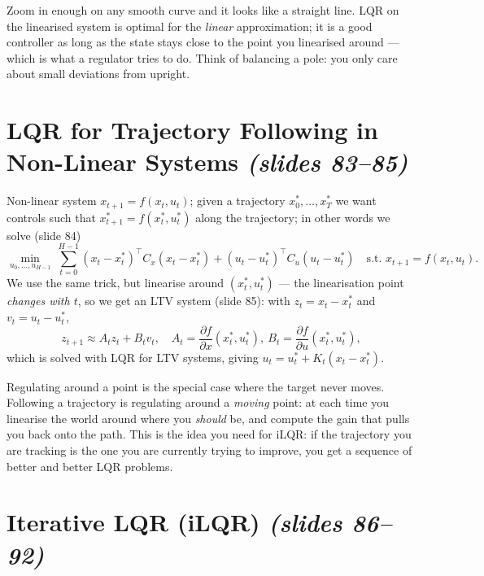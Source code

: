 \documentclass[11pt,a4paper]{article}
\newcommand{\slides}[1]{\emph{(slides #1)}}
\theoremstyle{plain}
\theoremstyle{definition}
\theoremstyle{remark}
\begin{document}
\begin{intuition}
Zoom in enough on any smooth curve and it looks like a straight line. LQR on the linearised system is optimal for the \emph{linear} approximation; it is a good controller as long as the state stays close to the point you linearised around --- which is what a regulator tries to do. Think of balancing a pole: you only care about small deviations from upright.
\end{intuition}

\section{LQR for Trajectory Following in Non-Linear Systems \slides{83--85}}

Non-linear system $x_{t+1}=f(x_t,u_t)$; given a trajectory $x^*_0,\dots,x^*_T$ we want controls such that $x^*_{t+1}=f(x^*_t,u^*_t)$ along the trajectory; in other words we solve (slide 84)
\[
\min_{u_0,\dots,u_{H-1}}\ \sum_{t=0}^{H-1}(x_t-x_t^*)^\top C_x(x_t-x^*_t)+(u_t-u^*_t)^\top C_u(u_t-u^*_t)\quad\text{s.t. } x_{t+1}=f(x_t,u_t).
\]
We use the same trick, but linearise around $(x^*_t,u^*_t)$ --- the linearisation point \emph{changes with $t$}, so we get an LTV system (slide 85): with $z_t=x_t-x^*_t$ and $v_t=u_t-u^*_t$,
\[
z_{t+1}\approx A_tz_t+B_tv_t,\quad A_t=\frac{\partial f}{\partial x}(x^*_t,u^*_t),\ B_t=\frac{\partial f}{\partial u}(x^*_t,u^*_t),
\]
which is solved with LQR for LTV systems, giving $u_t=u^*_t+K_t(x_t-x^*_t)$.

\begin{intuition}
Regulating around a point is the special case where the target never moves. Following a trajectory is regulating around a \emph{moving} point: at each time you linearise the world around where you \emph{should} be, and compute the gain that pulls you back onto the path. This is the idea you need for iLQR: if the trajectory you are tracking is the one you are currently trying to improve, you get a sequence of better and better LQR problems.
\end{intuition}

\section{Iterative LQR (iLQR) \slides{86--92}}
\end{document}
